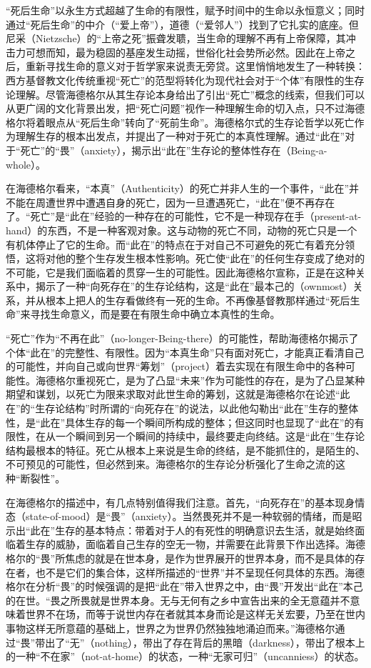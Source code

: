 \documentclass[UTF8, 12pt, a4paper]{ctexrep}
\begin{document}
“死后生命”以永生方式超越了生命的有限性，赋予时间中的生命以永恒意义；同时通过“死后生命”的中介（“爱上帝”），道德（“爱邻人”）找到了它扎实的底座。但尼采（Nietzsche）的“上帝之死”振聋发聩，当生命的理解不再有上帝保障，其冲击力可想而知，最为稳固的基座发生动摇，世俗化社会势所必然。因此在上帝之后，重新寻找生命的意义对于哲学家来说责无旁贷。这里悄悄地发生了一种转换：西方基督教文化传统重视“死亡”的范型将转化为现代社会对于“个体”有限性的生存论理解。尽管海德格尔从其生存论本身给出了引出“死亡”概念的线索，但我们可以从更广阔的文化背景出发，把“死亡问题”视作一种理解生命的切入点，只不过海德格尔将着眼点从“死后生命”转向了“死前生命”。海德格尔式的生存论哲学以死亡作为理解生存的根本出发点，并提出了一种对于死亡的本真性理解。通过“此在”对于“死亡”的“畏”（anxiety），揭示出“此在”生存论的整体性存在（Being-a-whole）。

在海德格尔看来，“本真”（Authenticity）的死亡并非人生的一个事件，“此在”并不能在周遭世界中遭遇自身的死亡，因为一旦遭遇死亡，“此在”便不再存在了。“死亡”是“此在”经验的一种存在的可能性，它不是一种现存在手（present-at-hand）的东西，不是一种客观对象。这与动物的死亡不同，动物的死亡只是一个有机体停止了它的生命。而“此在”的特点在于对自己不可避免的死亡有着充分领悟，这将对他的整个生存发生根本性影响。死亡使“此在”的任何生存变成了绝对的不可能，它是我们面临着的贯穿一生的可能性。因此海德格尔宣称，正是在这种关系中，揭示了一种“向死存在”的生存论结构，这是“此在”最本己的（ownmost）关系，并从根本上把人的生存看做终有一死的生命。不再像基督教那样通过“死后生命”来寻找生命意义，而是要在有限生命中确立本真性的生命。

“死亡”作为“不再在此”（no-longer-Being-there）的可能性，帮助海德格尔揭示了个体“此在”的完整性、有限性。因为“本真生命”只有面对死亡，才能真正看清自己的可能性，并向自己或向世界“筹划”（project）着去实现在有限生命中的各种可能性。海德格尔重视死亡，是为了凸显“未来”作为可能性的存在，是为了凸显某种期望和谋划，以死亡为限来求取对此世生命的筹划，这就是海德格尔在论述“此在”的“生存论结构”时所谓的“向死存在”的说法，以此他勾勒出“此在”生存的整体性，是“此在”具体生存的每一个瞬间所构成的整体；但这同时也显现了“此在”的有限性，在从一个瞬间到另一个瞬间的持续中，最终要走向终结。这是“此在”生存论结构最根本的特征。死亡从根本上来说是生命的终结，是不能抓住的，是陌生的、不可预见的可能性，但必然到来。海德格尔的生存论分析强化了生命之流的这种“断裂性”。

在海德格尔的描述中，有几点特别值得我们注意。首先，“向死存在”的基本现身情态（state-of-mood）是“畏”（anxiety）。当然畏死并不是一种软弱的情绪，而是昭示出“此在”生存的基本特点：带着对于人的有死性的明确意识去生活，就是始终面临着生存的威胁，面临着自己生存的空无一物，并需要在此背景下作出选择。海德格尔的“畏”所焦虑的就是在世本身，是作为世界展开的世界本身，而不是具体的存在者，也不是它们的集合体，这样所描述的“世界”并不呈现任何具体的东西。海德格尔在分析“畏”的时候强调的是把“此在”带入世界之中，由“畏”开发出“此在”本己的在世。“畏之所畏就是世界本身。无与无何有之乡中宣告出来的全无意蕴并不意味着世界不在场，而等于说世内存在者就其本身而论是这样无关宏要，乃至在世内事物这样无所意蕴的基础上，世界之为世界仍然独独地涌迫而来。”海德格尔通过“畏”带出了“无”（nothing），带出了存在背后的黑暗（darkness），带出了根本上的一种“不在家”（not-at-home）的状态，一种“无家可归”（uncanniess）的状态。
\end{document}
